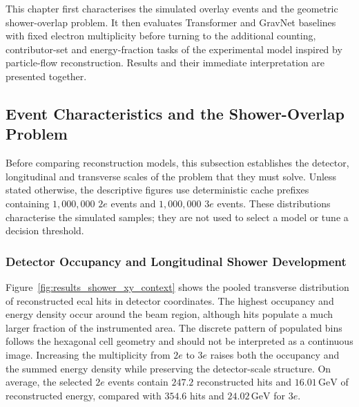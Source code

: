 
This chapter first characterises the simulated overlay events and the
geometric shower-overlap problem. It then evaluates Transformer and GravNet
baselines with fixed electron multiplicity before turning to the additional
counting, contributor-set and energy-fraction tasks of the experimental model
inspired by particle-flow reconstruction. Results and their immediate
interpretation are presented together.

\clearpage
\subsection{Event Characteristics and the Shower-Overlap Problem}
\label{sec:results_event_characteristics}

Before comparing reconstruction models, this subsection establishes the
detector, longitudinal and transverse scales of the problem that they must
solve. Unless stated otherwise, the descriptive figures use deterministic
cache prefixes containing \(1{,}000{,}000\) \(2e\) events and
\(1{,}000{,}000\) \(3e\)
events. These distributions characterise the simulated samples; they are not
used to select a model or tune a decision threshold.


\subsubsection{Detector Occupancy and Longitudinal Shower Development}

Figure~\ref{fig:results_shower_xy_context} shows the pooled transverse
distribution of reconstructed \gls{ecal} hits in detector coordinates. The
highest occupancy and energy density occur around the beam region, although
hits populate a much larger fraction of the instrumented area. The discrete
pattern of populated bins follows the hexagonal cell geometry and should not
be interpreted as a continuous image. Increasing the multiplicity from
\(2e\) to \(3e\) raises both the occupancy and the summed energy density while
preserving the detector-scale structure. On average, the selected \(2e\)
events contain \(247.2\) reconstructed hits and \(16.01\,\mathrm{GeV}\) of
reconstructed energy, compared with \(354.6\) hits and
\(24.02\,\mathrm{GeV}\) for \(3e\).

